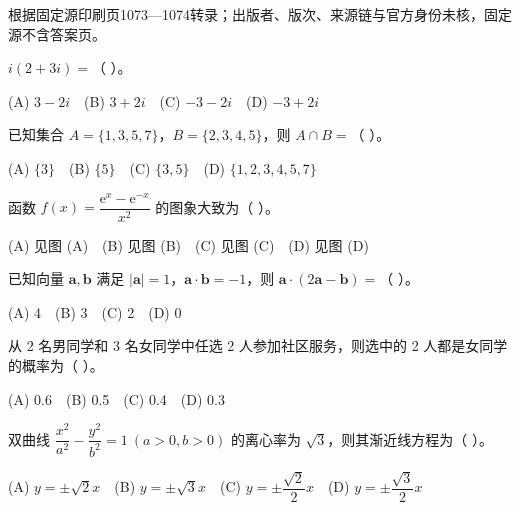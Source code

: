 


\begin{gktip}
根据固定源印刷页1073—1074转录；出版者、版次、来源链与官方身份未核，固定源不含答案页。
\end{gktip}


\begin{question}
$i(2+3i)=$（ ）。

(A) $3-2i$　(B) $3+2i$　(C) $-3-2i$　(D) $-3+2i$

\end{question}
\begin{question}
已知集合 $A=\{1,3,5,7\}$，$B=\{2,3,4,5\}$，则 $A\cap B=$（ ）。

(A) $\{3\}$　(B) $\{5\}$　(C) $\{3,5\}$　(D) $\{1,2,3,4,5,7\}$

\Needspace{0.4\textheight}
\end{question}
\begin{question}
函数 $f(x)=\dfrac{\mathrm e^x-\mathrm e^{-x}}{x^2}$ 的图象大致为（ ）。
\nopagebreak[4]
\begin{center}\end{center}
\nopagebreak[4]
(A) 见图 (A)　(B) 见图 (B)　(C) 见图 (C)　(D) 见图 (D)

\end{question}
\begin{question}
已知向量 $\boldsymbol a,\boldsymbol b$ 满足 $|\boldsymbol a|=1$，$\boldsymbol a\cdot\boldsymbol b=-1$，则 $\boldsymbol a\cdot(2\boldsymbol a-\boldsymbol b)=$（ ）。

(A) 4　(B) 3　(C) 2　(D) 0

\end{question}
\begin{question}
从 2 名男同学和 3 名女同学中任选 2 人参加社区服务，则选中的 2 人都是女同学的概率为（ ）。

(A) 0.6　(B) 0.5　(C) 0.4　(D) 0.3

\end{question}
\begin{question}
双曲线 $\dfrac{x^2}{a^2}-\dfrac{y^2}{b^2}=1\ (a>0,b>0)$ 的离心率为 $\sqrt3$，则其渐近线方程为（ ）。

(A) $y=\pm\sqrt2 x$　(B) $y=\pm\sqrt3 x$　(C) $y=\pm\dfrac{\sqrt2}{2}x$　(D) $y=\pm\dfrac{\sqrt3}{2}x$

\end{question}
